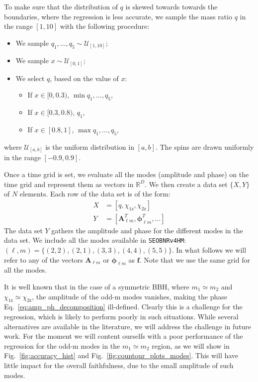 \documentclass[twocolumn,showpacs,preprintnumbers,nofootinbib,prd,
superscriptaddress,10pt]{revtex4-2}
\newcommand{\R}{\mathbb{R}}
\begin{document}
To make sure that the distribution of $q$ is skewed towards towards the boundaries, where the regression is less accurate, we sample the mass ratio $q$ in the range $[1,10]$ with the following procedure:
\begin{itemize}
	\item We sample $q_1, \hdots, q_5 \sim \mathcal{U}_{[1,10]}$;
	\item We sample $x \sim \mathcal{U}_{[0,1]}$;
	\item We select $q$, based on the value of $x$:
	\begin{itemize}
		\item If $x \in [0,0.3)$, $\min q_1, \hdots, q_5$,
		\item If $x \in [0.3, 0.8)$, $q_1$,
		\item If $x \in [0.8, 1]$, $\max q_1, \hdots, q_5$,
	\end{itemize}
\end{itemize}
where $\mathcal{U}_{[a,b]}$ is the uniform distribution in $[a,b]$.
The spins are drawn uniformly in the range $[-0.9, 0.9]$.

Once a time grid is set, we evaluate all the modes (amplitude and phase) on the time grid and represent them as vectors in $\R^D$.
We then create a data set $\{X, Y\}$ of $N$ elements. Each row of the data set is of the form:
\begin{align}
	X &= [q, \chi_\text{1z}, \chi_\text{2z}] \\
	Y &= [\boldsymbol{A}^T_{\ell m}, \boldsymbol{\phi}^T_{\ell m}, \hdots ] 
\end{align}
%
The data set $Y$ gathers the amplitude and phase for the different modes in the data set.
We include all the modes available in \texttt{SEOBNRv4HM}: $(\ell, m) = \{(2,2),(2,1), (3,3), (4,4), (5,5)\}$.
%
In what follows we will refer to any of the vectors $\boldsymbol{A}_{\ell m}$ or $\boldsymbol{\phi}_{\ell m}$ as $\boldsymbol{f}$.
Note that we use the same grid for all the modes.

It is well known \cite{Blackman:2015pia, Varma:2018mmi} that in the case of a symmetric BBH, where $m_1\simeq m_2$ and $\chi_\text{1z} \simeq \chi_\text{2z}$, the amplitude of the odd-m modes vanishes, making the phase Eq.~\eqref{eq:amp_ph_decomposition} ill-defined.
Clearly this is a challenge for the regression, which is likely to perform poorly in such situations.
While several alternatives are available in the literature, we will address the challenge in future work. For the moment we will content ourselfs with a poor performance of the regression for the odd-m modes in the $m_1\simeq m_2$ region, as we will show in Fig.~\ref{fig:accuracy_hist} and Fig.~\ref{fig:countour_plots_modes}. This will have little impact for the overall faithfulness, due to the small amplitude of such modes.
\end{document}
